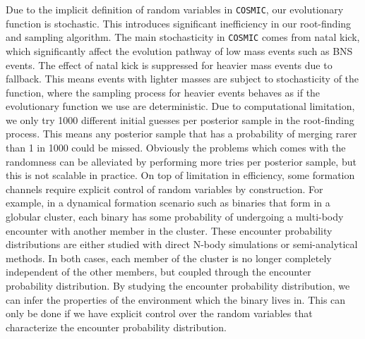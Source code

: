 \documentclass[twocolumn]{aastex631}
\begin{document}
Due to the implicit definition of random variables in \texttt{COSMIC}, our evolutionary function is stochastic.
This introduces significant inefficiency in our root-finding and sampling algorithm.
The main stochasticity in \texttt{COSMIC} comes from natal kick, which significantly affect the evolution pathway of low mass events such as BNS events.
The effect of natal kick is suppressed for heavier mass events due to fallback.
This means events with lighter masses are subject to stochasticity of the function,
where the sampling process for heavier events behaves as if the evolutionary function we use are deterministic.
Due to computational limitation, we only try 1000 different initial guesses per posterior sample in the root-finding process.
This means any posterior sample that has a probability of merging rarer than 1 in 1000 could be missed.
Obviously the problems which comes with the randomness can be alleviated by performing more tries per posterior sample,
but this is not scalable in practice.
On top of limitation in efficiency, some formation channels require explicit control of random variables by construction.
For example, in a dynamical formation scenario such as binaries that form in a globular cluster,
each binary has some probability of undergoing a multi-body encounter with another member in the cluster.
These encounter probability distributions are either studied with direct N-body simulations or semi-analytical methods.
In both cases, each member of the cluster is no longer completely independent of the other members, but coupled through the encounter probability distribution.
By studying the encounter probability distribution, we can infer the properties of the environment which the binary lives in.
This can only be done if we have explicit control over the random variables that characterize the encounter probability distribution.




\end{document}
